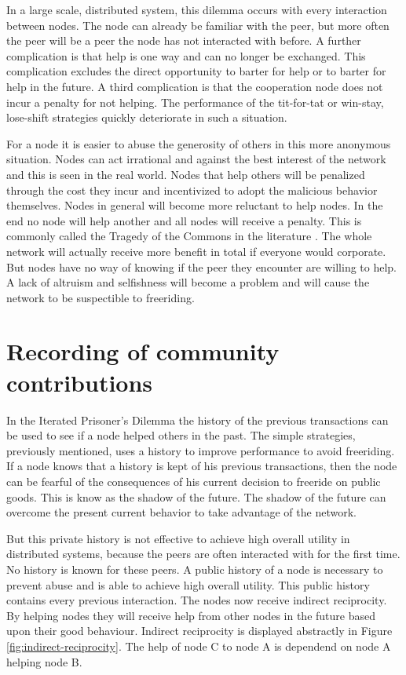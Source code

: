 In a large scale, distributed system, this dilemma occurs with every interaction between nodes.
The node can already be familiar with the peer,
but more often the peer will be a peer the node has not interacted with before.
A further complication is that help is one way and can no longer be exchanged.
This complication excludes the direct opportunity to barter for help 
or to barter for help in the future\cite{Lai-Incentives}.
A third complication is that the cooperation node does not incur a penalty for not helping.
The performance of the tit-for-tat or win-stay, lose-shift strategies
quickly deteriorate in such a situation.

For a node it is easier to abuse the generosity of others in this more anonymous situation.
Nodes can act irrational and against the best interest of the network
and this is seen in the real world\cite{Adar-Freeriding}.
Nodes that help others will be penalized through the cost they incur
and incentivized to adopt the malicious behavior themselves.
Nodes in general will become more reluctant to help nodes\cite{Nowak-PrisonerDilemma}.
In the end no node will help another and all nodes will receive a penalty.
This is commonly called the Tragedy of the Commons in the literature \cite{Hardin-Tragedy}.
The whole network will actually receive more benefit in total if everyone would corporate.
But nodes have no way of knowing if the peer they encounter are willing to help.
A lack of altruism and selfishness will become a problem 
and will cause the network to be suspectible to freeriding.

\section{Recording of community contributions}
In the Iterated Prisoner's Dilemma the history of the previous transactions can be used 
to see if a node helped others in the past.
The simple strategies, previously mentioned, uses a history to improve performance
to avoid freeriding.
If a node knows that a history is kept of his previous transactions,
then the node can be fearful of the consequences of his current decision to freeride on public goods.
This is know as the shadow of the future\cite{bo-shadow}.
The shadow of the future can overcome the present current behavior to take advantage of the network.

But this private history is not effective to achieve high overall utility in distributed systems,
because the peers are often interacted with for the first time.
No history is known for these peers.
A public history of a node is necessary to prevent abuse
and is able to achieve high overall utility\cite{Lai-Incentives}.
This public history contains every previous interaction.
The nodes now receive indirect reciprocity\cite{Nowak-Cooperation}.
By helping nodes they will receive help from other nodes in the future based upon their good behaviour.
Indirect reciprocity is displayed abstractly in Figure \ref{fig:indirect-reciprocity}.
The help of node C to node A is dependend on node A helping node B.

